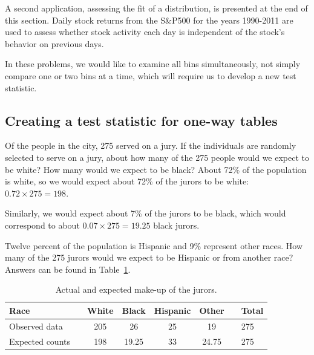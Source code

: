A second application, assessing the fit of a distribution, is presented at the end of this section. Daily stock returns from the S\&P500 for the years 1990-2011 are used to assess whether stock activity each day is independent of the stock's behavior on previous days.

In these problems, we would like to examine all bins simultaneously, not simply compare one or two bins at a time, which will require us to develop a new test statistic.


\subsection{Creating a test statistic for one-way tables}

\begin{example}{Of the people in the city, 275 served on a jury. If the individuals are randomly selected to serve on a jury, about how many of the 275 people would we expect to be white? How many would we expect to be black?}
About 72\% of the population is white, so we would expect about 72\% of the jurors to be white: $0.72\times 275 = 198$.

Similarly, we would expect about 7\% of the jurors to be black, which would correspond to about $0.07\times 275 = 19.25$ black jurors.
\end{example}

\begin{exercise}
Twelve percent of the population is Hispanic and 9\% represent other races. How many of the 275 jurors would we expect to be Hispanic or from another race? Answers can be found in Table~\ref{expectedJuryRepresentationIfNoBias}.
\end{exercise}

\begin{table}[h]
\centering
\begin{tabular}{ll ccc c ll}
\hline
Race	 & \hspace{2mm} & White & Black & Hispanic & Other & \hspace{2mm} & Total \\
\hline
Observed data			&	& 205 & 26	& 25 & 19	&	& 275 \\
Expected counts	 &	& 198 & 19.25 & 33 & 24.75 & & 275 \\
\hline
\end{tabular}
\caption{Actual and expected make-up of the jurors.}
\label{expectedJuryRepresentationIfNoBias}
\end{table}

